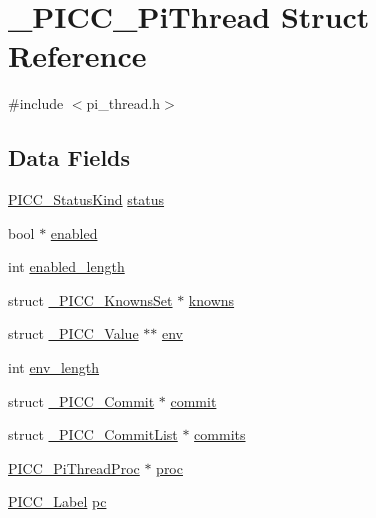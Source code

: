 \hypertarget{struct__PICC__PiThread}{\section{\-\_\-\-P\-I\-C\-C\-\_\-\-Pi\-Thread Struct Reference}
\label{struct__PICC__PiThread}
}


{\ttfamily \#include $<$pi\-\_\-thread.\-h$>$}

\subsection*{Data Fields}
{\bf }\par
\begin{DoxyCompactItemize}
\item 
\hyperlink{pi__thread_8h_ad84837e3a6881fa52eadad5f96b0444a}{P\-I\-C\-C\-\_\-\-Status\-Kind} \hyperlink{struct__PICC__PiThread_a08e8708363d2deb97335407398229118}{status}
\item 
bool $\ast$ \hyperlink{struct__PICC__PiThread_a1f2c99b2169bd58582a8b4320c2106a0}{enabled}
\item 
int \hyperlink{struct__PICC__PiThread_a0443e5525ef66064fbfb5ea4722f0fda}{enabled\-\_\-length}
\item 
struct \hyperlink{struct__PICC__KnownsSet}{\-\_\-\-P\-I\-C\-C\-\_\-\-Knowns\-Set} $\ast$ \hyperlink{struct__PICC__PiThread_aa1110c046d4ccd425e20e5a99de6dbac}{knowns}
\item 
struct \hyperlink{struct__PICC__Value}{\-\_\-\-P\-I\-C\-C\-\_\-\-Value} $\ast$$\ast$ \hyperlink{struct__PICC__PiThread_a2ad1dca93b2d7b8227d400a5f0fd5003}{env}
\item 
int \hyperlink{struct__PICC__PiThread_a8fce59a9f1cf87c981af443cba62fb86}{env\-\_\-length}
\item 
struct \hyperlink{struct__PICC__Commit}{\-\_\-\-P\-I\-C\-C\-\_\-\-Commit} $\ast$ \hyperlink{struct__PICC__PiThread_a7fabb4c7acd615b20bdccd6ed32ff4f8}{commit}
\item 
struct \hyperlink{struct__PICC__CommitList}{\-\_\-\-P\-I\-C\-C\-\_\-\-Commit\-List} $\ast$ \hyperlink{struct__PICC__PiThread_af9256cdd22994cccbe76e7ef530430f8}{commits}
\item 
\hyperlink{pi__thread_8h_a0d65636a870782d26eb035fe3b841414}{P\-I\-C\-C\-\_\-\-Pi\-Thread\-Proc} $\ast$ \hyperlink{struct__PICC__PiThread_a2ad879cabbe165e57b105c4060c565a1}{proc}
\item 
\hyperlink{symbols_8h_ae23ad6ae115253385182f5a898d32c1e}{P\-I\-C\-C\-\_\-\-Label} \hyperlink{struct__PICC__PiThread_a92b638ec192f3beaa4b3a509124a539d}{pc}
$$
\end{DoxyCompactItemize}
